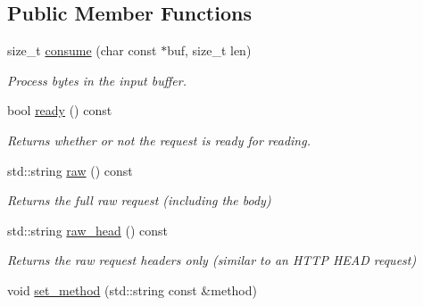 \subsection*{Public Member Functions}
\begin{DoxyCompactItemize}
\item 
size\+\_\+t \hyperlink{classwebsocketpp_1_1http_1_1parser_1_1request_abd9cae6f44634d62253d806d982ab1d6}{consume} (char const $\ast$buf, size\+\_\+t len)
\begin{DoxyCompactList}\small\item\em Process bytes in the input buffer. \end{DoxyCompactList}\item 
bool \hyperlink{classwebsocketpp_1_1http_1_1parser_1_1request_ac8c99fa6b7324d95b32edad8f9f584aa}{ready} () const\hypertarget{classwebsocketpp_1_1http_1_1parser_1_1request_ac8c99fa6b7324d95b32edad8f9f584aa}{}\label{classwebsocketpp_1_1http_1_1parser_1_1request_ac8c99fa6b7324d95b32edad8f9f584aa}

\begin{DoxyCompactList}\small\item\em Returns whether or not the request is ready for reading. \end{DoxyCompactList}\item 
std\+::string \hyperlink{classwebsocketpp_1_1http_1_1parser_1_1request_a27fbcad6aae2a98c9cc0efc4fdd7da8c}{raw} () const\hypertarget{classwebsocketpp_1_1http_1_1parser_1_1request_a27fbcad6aae2a98c9cc0efc4fdd7da8c}{}\label{classwebsocketpp_1_1http_1_1parser_1_1request_a27fbcad6aae2a98c9cc0efc4fdd7da8c}

\begin{DoxyCompactList}\small\item\em Returns the full raw request (including the body) \end{DoxyCompactList}\item 
std\+::string \hyperlink{classwebsocketpp_1_1http_1_1parser_1_1request_afb77b09be8112bb60dd80cf21d032eff}{raw\+\_\+head} () const\hypertarget{classwebsocketpp_1_1http_1_1parser_1_1request_afb77b09be8112bb60dd80cf21d032eff}{}\label{classwebsocketpp_1_1http_1_1parser_1_1request_afb77b09be8112bb60dd80cf21d032eff}

\begin{DoxyCompactList}\small\item\em Returns the raw request headers only (similar to an H\+T\+TP H\+E\+AD request) \end{DoxyCompactList}\item 
void \hyperlink{classwebsocketpp_1_1http_1_1parser_1_1request_af1f0c6944c6cbbaf6db20e5830333eaf}{set\+\_\+method} (std\+::string const \&method)\hypertarget{classwebsocketpp_1_1http_1_1parser_1_1request_af1f0c6944c6cbbaf6db20e5830333eaf}{}\label{classwebsocketpp_1_1http_1_1parser_1_1request_af1f0c6944c6cbbaf6db20e5830333eaf}


\end{DoxyCompactItemize}
